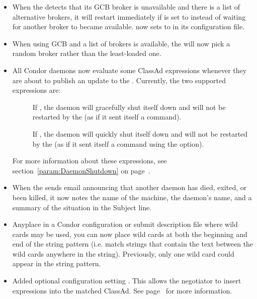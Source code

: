 \begin{itemize}
\item When the  detects that its GCB broker is unavailable
and there is a list of alternative brokers,
it will restart immediately if  is
set to  instead of waiting for another broker to became available.
 now sets 
to   in its configuration file.

\item When using GCB and a list of brokers is available, the
 will now pick a random broker rather than the least-loaded
one.

\item All Condor daemons now evaluate some ClassAd expressions
  whenever they are about to publish an update to the
  .
  Currently, the two supported expressions are:
  \begin{description}
  \item[]
    If , the daemon will gracefully shut itself down and will not
    be restarted by the  (as if it sent itself a
     command).
  \item[]
    If , the daemon will quickly shut itself down and will not be
    restarted by the  (as if it sent itself a
     command using the  option).
  \end{description}
  For more information about these expressions, see
  section~\ref{param:DaemonShutdown} on
  page~\pageref{param:DaemonShutdown}.

\item When the  sends email announcing that another daemon has
died, exited, or been killed, it now notes the name of the machine, the
daemon's name, and a summary of the situation in the Subject line.

\item Anyplace in a Condor configuration or submit description file where
wild cards may be used, you can now place wild cards at both the beginning
and end of the string pattern (i.e. match strings that contain the text
between the wild cards anywhere in the string). Previously, only one
wild card could appear in the string pattern.

\item Added optional configuration setting
.  This allows the negotiator to
insert expressions into the matched ClassAd.  See
page~\pageref{param:NegotiatorMatchExprs} for more information.


\end{itemize}
